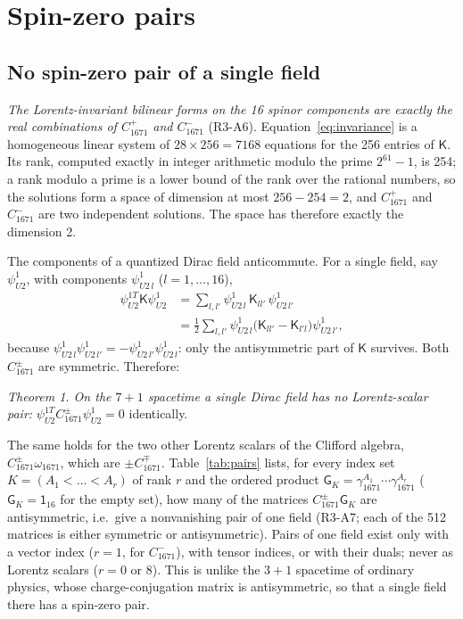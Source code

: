 \section{Spin-zero pairs}
\label{sec:pairs}

\subsection{No spin-zero pair of a single field}

\emph{The Lorentz-invariant bilinear forms on the 16 spinor components are exactly the real
combinations of $C^+_{1671}$ and $C^-_{1671}$} (R3-A6). Equation~\eqref{eq:invariance} is a
homogeneous linear system of $28\times256=7168$ equations for the 256 entries of $\mathsf K$.
Its rank, computed exactly in integer arithmetic modulo the prime $2^{61}-1$, is 254; a rank
modulo a prime is a lower bound of the rank over the rational numbers, so the solutions form a
space of dimension at most $256-254=2$, and $C^+_{1671}$ and $C^-_{1671}$ are two independent
solutions. The space has therefore exactly the dimension 2.

The components of a quantized Dirac field anticommute. For a single field, say $\psi^1_{U2}$,
with components $\psi^1_{U2\,l}$ ($l=1,\dots,16$),
\begin{equation}
\begin{aligned}
\psi^{1T}_{U2}\mathsf K\psi^1_{U2}&=\sum_{l,l'}\psi^1_{U2\,l}\,\mathsf K_{ll'}\,\psi^1_{U2\,l'}\\
&=\tfrac12\sum_{l,l'}\psi^1_{U2\,l}\big(\mathsf K_{ll'}-\mathsf K_{l'l}\big)\psi^1_{U2\,l'},
\end{aligned}
\label{eq:antisym}
\end{equation}
because $\psi^1_{U2\,l}\psi^1_{U2\,l'}=-\psi^1_{U2\,l'}\psi^1_{U2\,l}$: only the antisymmetric part
of $\mathsf K$ survives. Both $C^\pm_{1671}$ are symmetric. Therefore:

\emph{Theorem 1. On the $7+1$ spacetime a single Dirac field has no Lorentz-scalar pair:}
$\psi^{1T}_{U2}C^\pm_{1671}\psi^1_{U2}=0$ identically.

The same holds for the two other Lorentz scalars of the Clifford algebra, $C^\pm_{1671}\omega_{1671}$,
which are $\pm C^\mp_{1671}$. Table~\ref{tab:pairs} lists, for every index set $K=(A_1<\dots<A_r)$
of rank $r$ and the ordered product $\mathsf G_K=\gamma^{A_1}_{1671}\cdots\gamma^{A_r}_{1671}$
($\mathsf G_K=\mathsf 1_{16}$ for the empty set), how many of the matrices
$C^\pm_{1671}\mathsf G_K$ are antisymmetric, i.e.\ give a nonvanishing pair of one field (R3-A7;
each of the 512 matrices is either symmetric or antisymmetric). Pairs of one field exist only
with a vector index ($r=1$, for $C^-_{1671}$), with tensor indices, or with their duals; never
as Lorentz scalars ($r=0$ or 8). This is unlike the $3+1$ spacetime of ordinary physics, whose
charge-conjugation matrix is antisymmetric, so that a single field there has a spin-zero pair.

